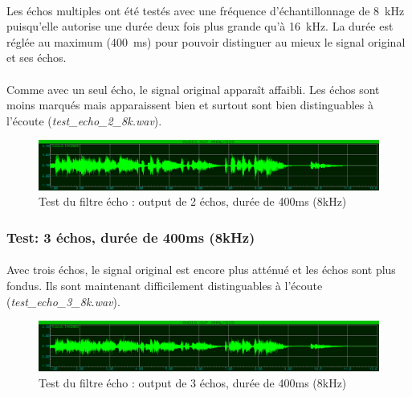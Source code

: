 \documentclass{article}
\begin{document}
    \paragraph{}
    Les échos multiples ont été testés avec une fréquence d'échantillonnage de \SI{8}{\kilo\hertz} puisqu'elle autorise une durée deux fois plus grande qu'à \SI{16}{\kilo\hertz}. La durée est réglée au maximum (\SI{400}{\milli\second}) pour pouvoir distinguer au mieux le signal original et ses échos.

    \paragraph{}
    Comme avec un seul écho, le signal original apparaît affaibli. Les échos sont moins marqués mais apparaissent bien et surtout sont bien distinguables à l'écoute (\emph{test\_echo\_2\_8k.wav}).
    \begin{figure}[H]
        \centering
        \includegraphics[width=\textwidth]{./images/out_echo_2_8k.png}
        \caption{Test du filtre écho : output de 2 échos, durée de 400ms (8kHz)}
    \end{figure}

    \subsubsection{Test: 3 échos, durée de 400ms (8kHz)}
    \paragraph{}
    Avec trois échos, le signal original est encore plus atténué et les échos sont plus fondus. Ils sont maintenant difficilement distinguables à l'écoute (\emph{test\_echo\_3\_8k.wav}).

    \begin{figure}[H]
        \centering
        \includegraphics[width=\textwidth]{./images/out_echo_3_8k.png}
        \caption{Test du filtre écho : output de 3 échos, durée de 400ms (8kHz)}
    \end{figure}
\end{document}
